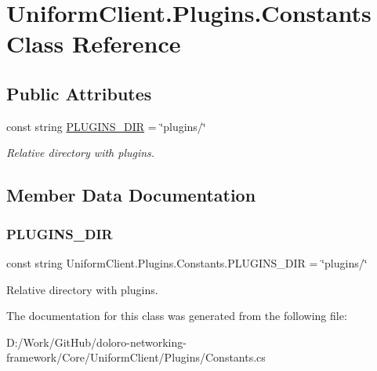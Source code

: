 \hypertarget{class_uniform_client_1_1_plugins_1_1_constants}{}\section{Uniform\+Client.\+Plugins.\+Constants Class Reference}
\label{class_uniform_client_1_1_plugins_1_1_constants}
\subsection*{Public Attributes}
\begin{DoxyCompactItemize}
\item 
const string \mbox{\hyperlink{class_uniform_client_1_1_plugins_1_1_constants_a7005abdb0c3ee5ba9e841769a7ecd575}{P\+L\+U\+G\+I\+N\+S\+\_\+\+D\+IR}} = \char`\"{}plugins/\char`\"{}
\begin{DoxyCompactList}\small\item\em Relative directory with plugins. \end{DoxyCompactList}\end{DoxyCompactItemize}


\subsection{Member Data Documentation}
\mbox{\label{class_uniform_client_1_1_plugins_1_1_constants_a7005abdb0c3ee5ba9e841769a7ecd575}} 
\subsubsection{\texorpdfstring{P\+L\+U\+G\+I\+N\+S\+\_\+\+D\+IR}{PLUGINS\_DIR}}
{\footnotesize\ttfamily const string Uniform\+Client.\+Plugins.\+Constants.\+P\+L\+U\+G\+I\+N\+S\+\_\+\+D\+IR = \char`\"{}plugins/\char`\"{}}



Relative directory with plugins. 



The documentation for this class was generated from the following file\+:\begin{DoxyCompactItemize}
\item 
D\+:/\+Work/\+Git\+Hub/doloro-\/networking-\/framework/\+Core/\+Uniform\+Client/\+Plugins/Constants.\+cs\end{DoxyCompactItemize}
